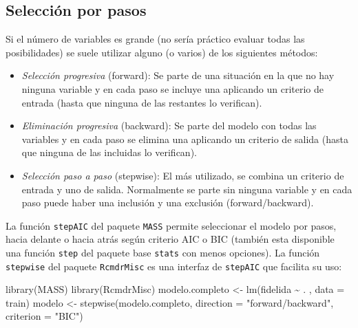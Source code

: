 \documentclass[
  spanish,
]{book}
\newenvironment{Shaded}{\begin{snugshade}}{\end{snugshade}}
\newcommand{\AttributeTok}[1]{\textcolor[rgb]{0.77,0.63,0.00}{#1}}
\newcommand{\FunctionTok}[1]{\textcolor[rgb]{0.00,0.00,0.00}{#1}}
\newcommand{\NormalTok}[1]{#1}
\newcommand{\OtherTok}[1]{\textcolor[rgb]{0.56,0.35,0.01}{#1}}
\newcommand{\SpecialCharTok}[1]{\textcolor[rgb]{0.00,0.00,0.00}{#1}}
\newcommand{\StringTok}[1]{\textcolor[rgb]{0.31,0.60,0.02}{#1}}
\theoremstyle{break}
\theoremstyle{definition}
\theoremstyle{definition}
\theoremstyle{definition}
\theoremstyle{definition}
\theoremstyle{remark}
\begin{document}
\hypertarget{selecciuxf3n-por-pasos}{%
\subsection{Selección por pasos}\label{selecciuxf3n-por-pasos}}

Si el número de variables es grande (no sería práctico evaluar todas las posibilidades)
se suele utilizar alguno (o varios) de los siguientes métodos:

\begin{itemize}
\item
  \emph{Selección progresiva} (forward): Se parte de una situación en la
  que no hay ninguna variable y en cada paso se incluye una aplicando
  un criterio de entrada (hasta que ninguna de las restantes lo
  verifican).
\item
  \emph{Eliminación progresiva} (backward): Se parte del modelo con todas
  las variables y en cada paso se elimina una aplicando un criterio
  de salida (hasta que ninguna de las incluidas lo verifican).
\item
  \emph{Selección paso a paso} (stepwise): El más utilizado, se combina
  un criterio de entrada y uno de salida. Normalmente se parte sin
  ninguna variable y en cada paso puede haber una inclusión y una
  exclusión (forward/backward).
\end{itemize}

La función \texttt{stepAIC} del paquete \texttt{MASS} permite seleccionar el modelo por pasos, hacia delante o hacia atrás según criterio AIC o BIC (también esta disponible una función \texttt{step} del paquete base \texttt{stats} con menos opciones).
La función \texttt{stepwise} del paquete \texttt{RcmdrMisc} es una interfaz de \texttt{stepAIC} que facilita su uso:

\begin{Shaded}
\begin{Highlighting}[]
\FunctionTok{library}\NormalTok{(MASS)}
\FunctionTok{library}\NormalTok{(RcmdrMisc)}
\NormalTok{modelo.completo }\OtherTok{\textless{}{-}} \FunctionTok{lm}\NormalTok{(fidelida }\SpecialCharTok{\textasciitilde{}}\NormalTok{ . , }\AttributeTok{data =}\NormalTok{ train)}
\NormalTok{modelo }\OtherTok{\textless{}{-}} \FunctionTok{stepwise}\NormalTok{(modelo.completo, }\AttributeTok{direction =} \StringTok{"forward/backward"}\NormalTok{, }\AttributeTok{criterion =} \StringTok{"BIC"}\NormalTok{)}
\end{Highlighting}
\end{Shaded}
\end{document}
